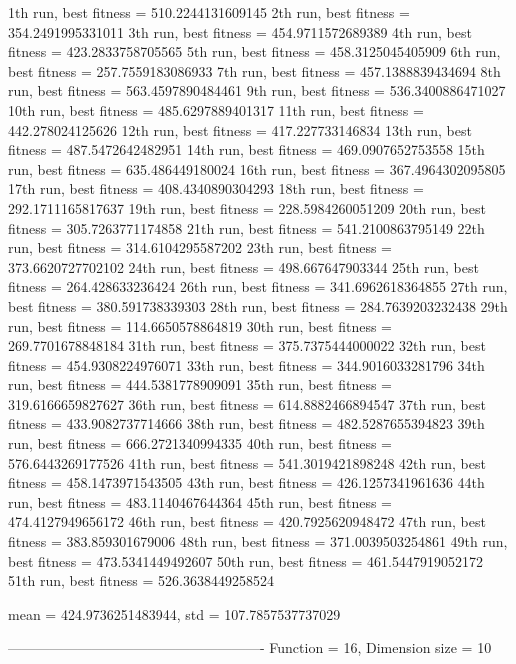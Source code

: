 1th run, best fitness = 510.2244131609145
2th run, best fitness = 354.2491995331011
3th run, best fitness = 454.9711572689389
4th run, best fitness = 423.2833758705565
5th run, best fitness = 458.3125045405909
6th run, best fitness = 257.7559183086933
7th run, best fitness = 457.1388839434694
8th run, best fitness = 563.4597890484461
9th run, best fitness = 536.3400886471027
10th run, best fitness = 485.6297889401317
11th run, best fitness = 442.278024125626
12th run, best fitness = 417.227733146834
13th run, best fitness = 487.5472642482951
14th run, best fitness = 469.0907652753558
15th run, best fitness = 635.486449180024
16th run, best fitness = 367.4964302095805
17th run, best fitness = 408.4340890304293
18th run, best fitness = 292.1711165817637
19th run, best fitness = 228.5984260051209
20th run, best fitness = 305.7263771174858
21th run, best fitness = 541.2100863795149
22th run, best fitness = 314.6104295587202
23th run, best fitness = 373.6620727702102
24th run, best fitness = 498.667647903344
25th run, best fitness = 264.428633236424
26th run, best fitness = 341.6962618364855
27th run, best fitness = 380.591738339303
28th run, best fitness = 284.7639203232438
29th run, best fitness = 114.6650578864819
30th run, best fitness = 269.7701678848184
31th run, best fitness = 375.7375444000022
32th run, best fitness = 454.9308224976071
33th run, best fitness = 344.9016033281796
34th run, best fitness = 444.5381778909091
35th run, best fitness = 319.6166659827627
36th run, best fitness = 614.8882466894547
37th run, best fitness = 433.9082737714666
38th run, best fitness = 482.5287655394823
39th run, best fitness = 666.2721340994335
40th run, best fitness = 576.6443269177526
41th run, best fitness = 541.3019421898248
42th run, best fitness = 458.1473971543505
43th run, best fitness = 426.1257341961636
44th run, best fitness = 483.1140467644364
45th run, best fitness = 474.4127949656172
46th run, best fitness = 420.7925620948472
47th run, best fitness = 383.859301679006
48th run, best fitness = 371.0039503254861
49th run, best fitness = 473.5341449492607
50th run, best fitness = 461.5447919052172
51th run, best fitness = 526.3638449258524

mean = 424.9736251483944, std = 107.7857537737029

-------------------------------------------------------
Function = 16, Dimension size = 10

